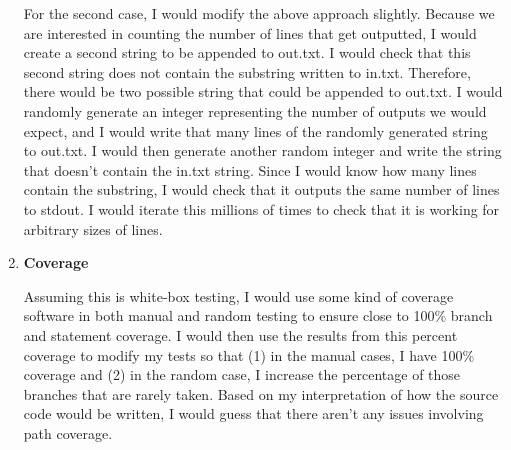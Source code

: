 \documentclass[11pt,letterpaper]{article}
\begin{document}
\begin{enumerate}[label=\arabic*.]
    For the second case, I would modify the above approach slightly. Because we are interested
    in counting the number of lines that get outputted, I would create a second string
    to be appended to out.txt. I would check that this second string does not contain
    the substring written to in.txt. Therefore, there would be two possible string that 
    could be appended to out.txt. I would randomly generate an integer representing the
    number of outputs we would expect, and I would write that many lines of the randomly generated
    string to out.txt. I would then generate another random integer and write the string
    that doesn't contain the in.txt string. Since I would know how many lines contain the
    substring, I would check that it outputs the same number of lines to stdout. I would
    iterate this millions of times to check that it is working for arbitrary sizes of 
    lines. 
    
  \item \textbf{Coverage}
    
    Assuming this is white-box testing, I would use some kind of coverage software in
    both manual and random testing to ensure close to 100\% branch and statement 
    coverage. I would then use the results from this percent coverage to modify my tests
    so that (1) in the manual cases, I have 100\% coverage and (2) in the random case, 
    I increase the percentage of those branches that are rarely taken. 
    Based on my interpretation of how the source code would be written, I would
    guess that there aren't any issues involving path coverage. 

\end{enumerate}
\end{document}
